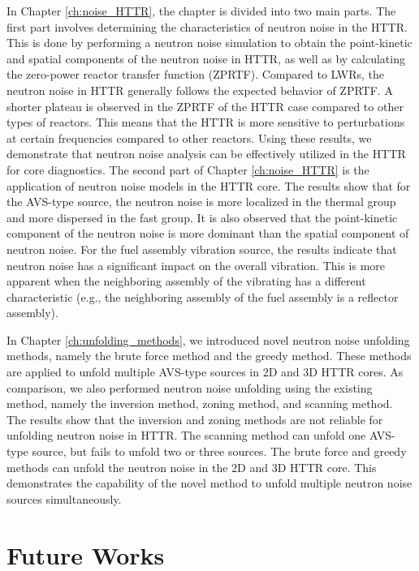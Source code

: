 In Chapter \ref{ch:noise_HTTR}, the chapter is divided into two main parts. The first part involves determining the characteristics of neutron noise in the HTTR. This is done by performing a neutron noise simulation to obtain the point-kinetic and spatial components of the neutron noise in HTTR, as well as by calculating the zero-power reactor transfer function (ZPRTF). Compared to LWRs, the neutron noise in HTTR generally follows the expected behavior of ZPRTF. A shorter plateau is observed in the ZPRTF of the HTTR case compared to other types of reactors. This means that the HTTR is more sensitive to perturbations at certain frequencies compared to other reactors. Using these results, we demonstrate that neutron noise analysis can be effectively utilized in the HTTR for core diagnostics. The second part of Chapter \ref{ch:noise_HTTR} is the application of neutron noise models in the HTTR core. The results show that for the AVS-type source, the neutron noise is more localized in the thermal group and more dispersed in the fast group. It is also observed that the point-kinetic component of the neutron noise is more dominant than the spatial component of neutron noise. For the fuel assembly vibration source, the results indicate that neutron noise has a significant impact on the overall vibration. This is more apparent when the neighboring assembly of the vibrating has a different characteristic (e.g., the neighboring assembly of the fuel assembly is a reflector assembly). 

In Chapter \ref{ch:unfolding_methods}, we introduced novel neutron noise unfolding methods, namely the brute force method and the greedy method. These methods are applied to unfold multiple AVS-type sources in 2D and 3D HTTR cores. As comparison, we also performed neutron noise unfolding using the existing method, namely the inversion method, zoning method, and scanning method. The results show that the inversion and zoning methods are not reliable for unfolding neutron noise in HTTR. The scanning method can unfold one AVS-type source, but fails to unfold two or three sources. The brute force and greedy methods can unfold the neutron noise in the 2D and 3D HTTR core. This demonstrates the capability of the novel method to unfold multiple neutron noise sources simultaneously.

\section{Future Works}

